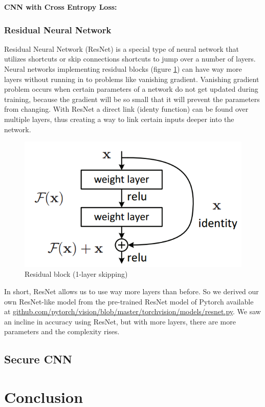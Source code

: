 \textbf{CNN with Cross Entropy Loss:}

\subsubsection{Residual Neural Network}
Residual Neural Network (ResNet) is a special type of neural network that utilizes shortcuts or skip connections shortcuts to jump over a number of layers. Neural networks implementing residual blocks (figure \ref{fig:residualblock}) can have way more layers without running in to problems like vanishing gradient. Vanishing gradient problem occurs when certain parameters of a network do not get updated during training, because the gradient will be so small that it will prevent the parameters from changing. With ResNet a direct link (identy function) can be found over multiple layers, thus creating a way to link certain inputs deeper into the network.

\begin{figure}[H]
  \includegraphics[scale=0.5]{fig/residualblock.png}
  \centering
  \caption{Residual block (1-layer skipping)}
  \label{fig:residualblock}
\end{figure}

In short, ResNet allows us to use way more layers than before. So we derived our own ResNet-like model from the pre-trained ResNet model of Pytorch available at \url{github.com/pytorch/vision/blob/master/torchvision/models/resnet.py}. We saw an incline in accuracy using ResNet, but with more layers, there are more parameters and the complexity rises.

\subsection{Secure CNN}
\label{SecureCNN}


\section{Conclusion}
